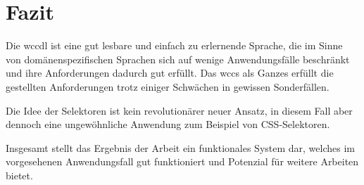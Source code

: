 \section{Fazit}
    Die \gls{wccdl} ist eine gut lesbare und einfach zu erlernende Sprache,
    die im Sinne von domänenspezifischen Sprachen
    sich auf wenige Anwendungsfälle beschränkt
    und ihre Anforderungen dadurch gut erfüllt.
    Das \gls{wccs} als Ganzes erfüllt die gestellten Anforderungen
    trotz einiger Schwächen in gewissen Sonderfällen.

    Die Idee der Selektoren ist kein revolutionärer neuer Ansatz,
    in diesem Fall aber dennoch eine ungewöhnliche Anwendung
    zum Beispiel von CSS-Selektoren.

    Insgesamt stellt das Ergebnis der Arbeit ein funktionales System dar,
    welches im vorgesehenen Anwendungsfall gut funktioniert
    und Potenzial für weitere Arbeiten bietet.